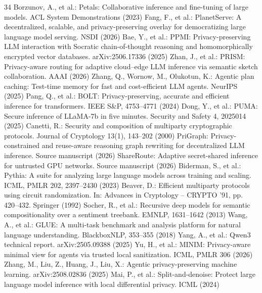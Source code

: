 \documentclass[runningheads]{llncs}
\begin{document}
\begin{thebibliography}{34}
 Borzunov, A., et al.: Petals: Collaborative inference and fine-tuning of large models. ACL System Demonstrations (2023)
 Fang, F., et al.: PlanetServe: A decentralized, scalable, and privacy-preserving overlay for democratizing large language model serving. NSDI (2026)
 Bae, Y., et al.: PPMI: Privacy-preserving LLM interaction with Socratic chain-of-thought reasoning and homomorphically encrypted vector databases. arXiv:2506.17336 (2025)
 Zhan, J., et al.: PRISM: Privacy-aware routing for adaptive cloud--edge LLM inference via semantic sketch collaboration. AAAI (2026)
 Zhang, Q., Wornow, M., Olukotun, K.: Agentic plan caching: Test-time memory for fast and cost-efficient LLM agents. NeurIPS (2025)
 Pang, Q., et al.: BOLT: Privacy-preserving, accurate and efficient inference for transformers. IEEE S\&P, 4753--4771 (2024)
 Dong, Y., et al.: PUMA: Secure inference of LLaMA-7b in five minutes. Security and Safety 4, 2025014 (2025)
 Canetti, R.: Security and composition of multiparty cryptographic protocols. Journal of Cryptology 13(1), 143--202 (2000)
 PriGraph: Privacy-constrained and reuse-aware reasoning graph rewriting for decentralized LLM inference. Source manuscript (2026)
 ShareRoute: Adaptive secret-shared inference for untrusted GPU networks. Source manuscript (2026)
 Biderman, S., et al.: Pythia: A suite for analyzing large language models across training and scaling. ICML, PMLR 202, 2397--2430 (2023)
 Beaver, D.: Efficient multiparty protocols using circuit randomization. In: Advances in Cryptology -- CRYPTO '91, pp. 420--432. Springer (1992)
 Socher, R., et al.: Recursive deep models for semantic compositionality over a sentiment treebank. EMNLP, 1631--1642 (2013)
 Wang, A., et al.: GLUE: A multi-task benchmark and analysis platform for natural language understanding. BlackboxNLP, 353--355 (2018)
 Yang, A., et al.: Qwen3 technical report. arXiv:2505.09388 (2025)
 Yu, H., et al.: MINIM: Privacy-aware minimal view for agents via trusted local sanitization. ICML, PMLR 306 (2026)
 Zhang, M., Liu, Z., Huang, J., Liu, X.: Agentic privacy-preserving machine learning. arXiv:2508.02836 (2025)
 Mai, P., et al.: Split-and-denoise: Protect large language model inference with local differential privacy. ICML (2024)

\end{thebibliography}
\end{document}
